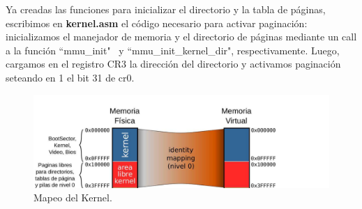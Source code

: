 \documentclass[a4paper]{article}
\begin{document}
\newpage 
\justify  
Ya creadas las funciones para inicializar el directorio y la tabla de páginas, escribimos en \textbf{kernel.asm} el código necesario para activar paginación: inicializamos el manejador de memoria y el directorio de páginas mediante un call a la función ``mmu_init" \ y ``mmu_init_kernel_dir", respectivamente. Luego, cargamos en el registro CR3 la dirección del directorio y activamos paginación seteando en 1 el bit 31 de cr0.

\begin{figure}[h]
	\centering
	\includegraphics[scale=0.5]{img/MapearKernel.pdf}
	\caption{Mapeo del Kernel.}
\end{figure}
\end{document}
